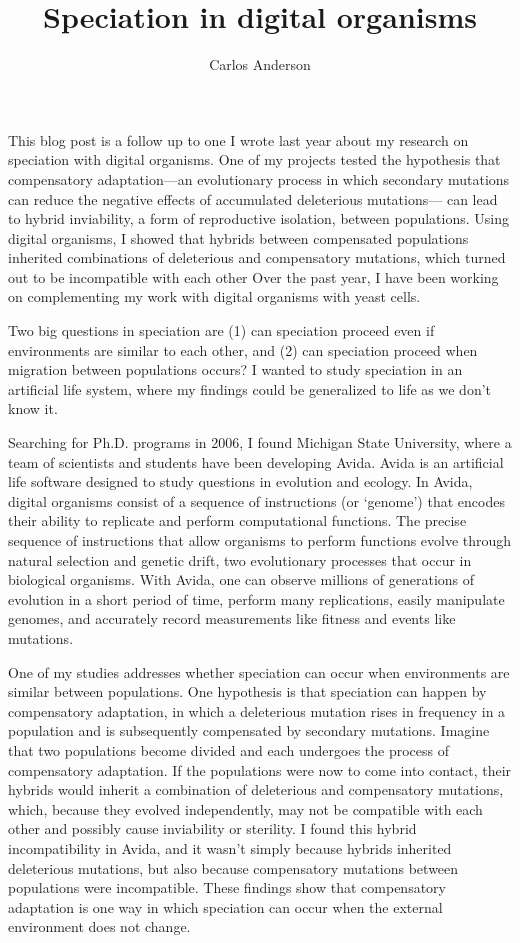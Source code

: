 \documentclass[12pt]{article}
\title{Speciation in digital organisms}
\author{Carlos Anderson}
\begin{document}
\maketitle

\baselineskip 24pt


This blog post is a follow up to one I wrote last year
about my research on speciation with digital organisms.
%
One of my projects tested the hypothesis that
compensatory adaptation---an evolutionary process
in which secondary mutations can reduce
the negative effects of accumulated deleterious mutations---%
can lead to hybrid inviability,
a form of reproductive isolation, between populations.
%
Using digital organisms, I showed that hybrids
between compensated populations inherited combinations
of deleterious and compensatory mutations,
which turned out to be incompatible with each other
%
Over the past year, I have been working on complementing
my work with digital organisms with yeast cells.
%


Two big questions in speciation are
(1) can speciation proceed even if environments are similar to each other,
and (2) can speciation proceed when migration between populations occurs?
%
I wanted to study speciation in an artificial life system,
where my findings could be generalized to life as we don't know it.



Searching for Ph.D. programs in 2006, I found Michigan State University,
where a team of scientists and students have been developing Avida.
%
Avida is an artificial life software
designed to study questions in evolution and ecology.
%
In Avida, digital organisms consist of a sequence of instructions (or `genome')
that encodes their ability to replicate and perform computational functions.
%
The precise sequence of instructions that
allow organisms to perform functions
evolve through natural selection and genetic drift,
two evolutionary processes that occur in biological organisms.
%
With Avida, one can observe millions of generations
of evolution in a short period of time,
perform many replications, easily manipulate genomes,
and accurately record measurements like fitness and events like mutations.



One of my studies addresses whether speciation
can occur when environments are similar between populations.
%
One hypothesis is that speciation can happen by compensatory adaptation,
in which a deleterious mutation rises in frequency in a population
and is subsequently compensated by secondary mutations.
%
Imagine that two populations become divided
and each undergoes the process of compensatory adaptation.
%
If the populations were now to come into contact,
their hybrids would inherit a combination of
deleterious and compensatory mutations,
which, because they evolved independently,
may not be compatible with each other
and possibly cause inviability or sterility.
%
I found this hybrid incompatibility in Avida,
and it wasn't simply because hybrids inherited
deleterious mutations, but also because
compensatory mutations between populations were incompatible.
%
These findings show that compensatory adaptation is
one way in which speciation can occur when
the external environment does not change.
\end{document}
